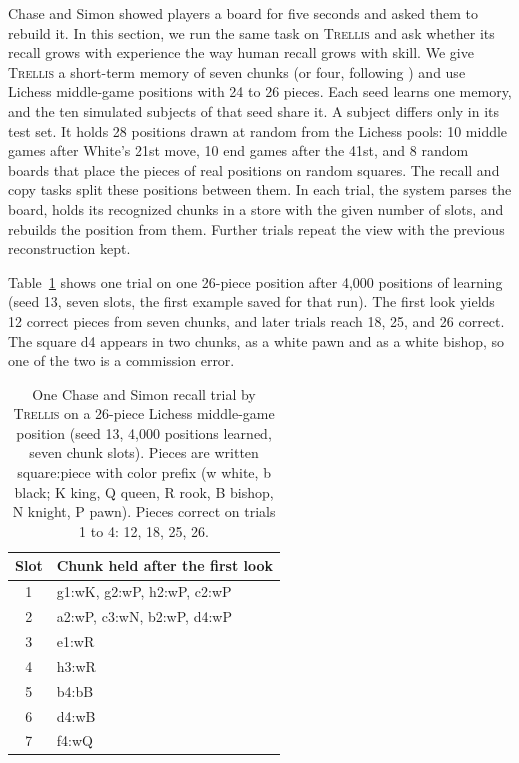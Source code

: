 \documentclass[11pt,letterpaper]{article}
\newcommand{\trellis}{\textsc{Trellis}}
\begin{document}
Chase and Simon showed players a board for five seconds and asked them to rebuild it. In this section, we run the same task on \trellis{} and ask whether its recall grows with experience the way human recall grows with skill.
We give \trellis{} a short-term memory of seven chunks (or four, following \citealp{cowan-magical-four}) and use Lichess middle-game positions with 24 to 26 pieces.
Each seed learns one memory, and the ten simulated subjects of that seed share it. A subject differs only in its test set.
It holds 28 positions drawn at random from the Lichess pools: 10 middle games after White's 21st move, 10 end games after the 41st, and 8 random boards that place the pieces of real positions on random squares. The recall and copy tasks split these positions between them.
In each trial, the system parses the board, holds its recognized chunks in a store with the given number of slots, and rebuilds the position from them. Further trials repeat the view with the previous reconstruction kept.

Table~\ref{tab:cstrial} shows one trial on one 26-piece position after 4,000 positions of learning (seed 13, seven slots, the first example saved for that run).
The first look yields 12 correct pieces from seven chunks, and later trials reach 18, 25, and 26 correct. The square d4 appears in two chunks, as a white pawn and as a white bishop, so one of the two is a commission error.

\begin{table}[!htbp]
\caption{One Chase and Simon recall trial by \trellis{} on a 26-piece Lichess middle-game position (seed 13, 4,000 positions learned, seven chunk slots). Pieces are written square:piece with color prefix (w white, b black; K king, Q queen, R rook, B bishop, N knight, P pawn). Pieces correct on trials 1 to 4: 12, 18, 25, 26.}
\label{tab:cstrial}
\begin{center}
\small
\begin{tabular}{cl}
\toprule
Slot & Chunk held after the first look \\
\midrule
1 & g1:wK, g2:wP, h2:wP, c2:wP \\
2 & a2:wP, c3:wN, b2:wP, d4:wP \\
3 & e1:wR \\
4 & h3:wR \\
5 & b4:bB \\
6 & d4:wB \\
7 & f4:wQ \\
\bottomrule
\end{tabular}
\end{center}
\end{table}
\end{document}
